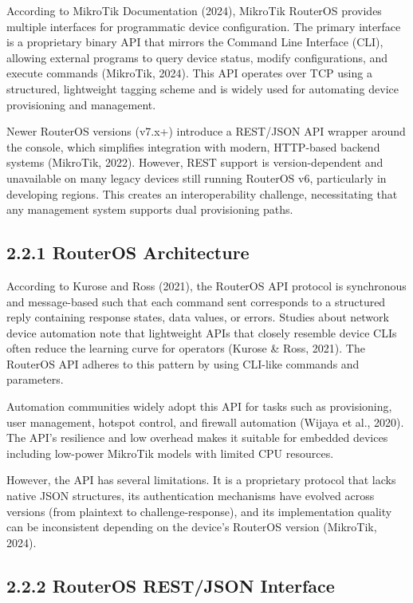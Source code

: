 \documentclass[12pt,a4paper,oneside]{report}
\begin{document}
According to MikroTik Documentation (2024), MikroTik RouterOS provides multiple interfaces for programmatic device configuration. The primary interface is a proprietary binary API that mirrors the Command Line Interface (CLI), allowing external programs to query device status, modify configurations, and execute commands (MikroTik, 2024). This API operates over TCP using a structured, lightweight tagging scheme and is widely used for automating device provisioning and management.

Newer RouterOS versions (v7.x+) introduce a REST/JSON API wrapper around the console, which simplifies integration with modern, HTTP-based backend systems (MikroTik, 2022). However, REST support is version-dependent and unavailable on many legacy devices still running RouterOS v6, particularly in developing regions. This creates an interoperability challenge, necessitating that any management system supports dual provisioning paths.

\subsection{2.2.1 RouterOS Architecture}

According to Kurose and Ross (2021), the RouterOS API protocol is synchronous and message-based such that each command sent corresponds to a structured reply containing response states, data values, or errors. Studies about network device automation note that lightweight APIs that closely resemble device CLIs often reduce the learning curve for operators (Kurose \& Ross, 2021). The RouterOS API adheres to this pattern by using CLI-like commands and parameters.

Automation communities widely adopt this API for tasks such as provisioning, user management, hotspot control, and firewall automation (Wijaya et al., 2020). The API's resilience and low overhead makes it suitable for embedded devices including low-power MikroTik models with limited CPU resources.

However, the API has several limitations. It is a proprietary protocol that lacks native JSON structures, its authentication mechanisms have evolved across versions (from plaintext to challenge-response), and its implementation quality can be inconsistent depending on the device's RouterOS version (MikroTik, 2024).

\subsection{2.2.2 RouterOS REST/JSON Interface}
\end{document}
